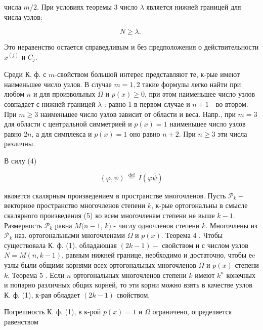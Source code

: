 \documentclass[10pt]{article}
\begin{document}
числа $m / 2$. При условиях теоремы 3 число $\lambda$ является нижней границей для числа узлов:



\[

N \geqslant \lambda \text {. }

\]



Это неравенство остается справедливым и без предположения о действительности $x^{(j)}$ и $C_{j}$.



Среди К. ф. с $m$-свойством большой интерес представляют те, к-рые имеют наименьшее число узлов. В случае $m=1,2$ такие формулы легко найти при любом $n$ и для произвольных $\Omega$ и $p(x) \geqslant 0$, при әтом наименьшее число узлов совпадает с нижней границей $\lambda$ : равно 1 в первом случае и $n+1$ - во втором. При $m \geqslant 3$ наименьшее число узлов зависит от области и веса. Напр., при $m=3$ для области с центральной симметрией и $p(x)=1$ наименьшее число узлов равно $2 n$, а для симплекса и $p(x)=1$ оно равно $n+2$. При $n \geqslant 3$ эти числа различны.



В силу (4)



\[

(\varphi, \psi) \stackrel{\text { def }}{=} I(\varphi \bar{\psi})

\]



является скалярным произведением в пространстве многочленов. Пусть $\mathscr{P}_{k}-$ векторное пространство многочленов степени $k$, к-рые ортогональны в смысле скалярного произведения (5) ко всем многочленам степени не выше $k-1$. Размерность $\mathscr{P}_{k}$ равна $M(n-1$, $k)$ - числу одночленов степени $k$. Многочлены из $\mathscr{P}_{k}$ наз. ортогональными многочленами $\Omega$ и $p(x)$. Теорема 4 . Чтобы существовала К. ф. (1), обладающая $(2 k-1)-$ свойством и с числом узлов $N=M(n, k-1)$, равным нижней границе, необходимо и достаточно, чтобы еe узлы были общими корнями всех ортогональных многочленов $\Omega$ и $p(x)$ степени $k$. Теорема 5 . Если $n$ ортогональных многочленов степени $k$ имеют $k^{n}$ конечных и попарно различных общих корней, то эти корни можно взять в качестве узлов К. ф. (1), к-рая обладает $(2 k-1)$ свойством.



Погрешность К. ф. (1), в к-рой $p(x)=1$ и $\Omega$ ограничено, определяется равенством
\end{document}
